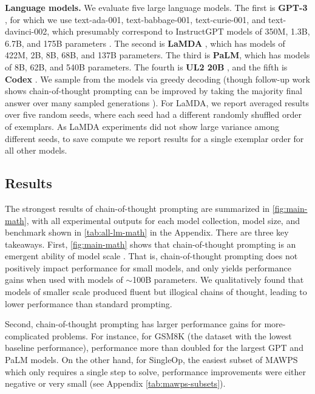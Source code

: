 \textbf{Language models.} We evaluate five large language models. The first is \textbf{GPT-3} \citep{brown2020language}, for which we use text-ada-001, text-babbage-001, text-curie-001, and text-davinci-002, which presumably correspond to InstructGPT models of 350M, 1.3B, 6.7B, and 175B parameters \citep{ouyang2022training}. The second is \textbf{LaMDA} \citep{thoppilan2022lamda}, which has models of 422M, 2B, 8B, 68B, and 137B parameters. The third is \textbf{PaLM}, which has models of 8B, 62B, and 540B parameters. The fourth is \textbf{UL2 20B} \citep{tay2022unifying}, and the fifth is \textbf{Codex} \citep[][code-davinci-002 in the OpenAI API]{chen2021evaluating}. We sample from the models via greedy decoding (though follow-up work shows chain-of-thought prompting can be improved by taking the majority final answer over many sampled generations \citep{wang2022self}). For LaMDA, we report averaged results over five random seeds, where each seed had a different randomly shuffled order of exemplars. As LaMDA experiments did not show large variance among different seeds, to save compute we report results for a single exemplar order for all other models.

\subsection{Results}
The strongest results of chain-of-thought prompting are summarized in \ref{fig:main-math}, with all experimental outputs for each model collection, model size, and benchmark shown in \ref{tab:all-lm-math} in the Appendix. There are three key takeaways. First, \ref{fig:main-math} shows that chain-of-thought prompting is an emergent ability of model scale \citep{wei2022emergent}. That is, chain-of-thought prompting does not positively impact performance for small models, and only yields performance gains when used with models of $\sim$100B parameters. We qualitatively found that models of smaller scale produced fluent but illogical chains of thought, leading to lower performance than standard prompting.

Second, chain-of-thought prompting has larger performance gains for more-complicated problems. For instance, for GSM8K (the dataset with the lowest baseline performance), performance more than doubled for the largest GPT and PaLM models. On the other hand, for SingleOp, the easiest subset of MAWPS which only requires a single step to solve, performance improvements were either negative or very small (see Appendix \ref{tab:mawps-subsets}).

